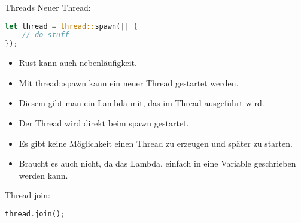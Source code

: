 
\begin{frame}[fragile,t]{Threads}
    Neuer Thread:
    \begin{lstlisting}[language=Rust,escapechar=@,label={lst:threads1-1}]
let thread = thread::spawn(|| {
    // do stuff
});\end{lstlisting}

     {
        \begin{itemize}
            \item Rust kann auch nebenläufigkeit.
            \item Mit thread::spawn kann ein neuer Thread gestartet werden.
            \item Diesem gibt man ein Lambda mit, das im Thread ausgeführt wird.
            \item Der Thread wird direkt beim spawn gestartet.
            \item Es gibt keine Möglichkeit einen Thread zu erzeugen und später zu starten.
            \item Braucht es auch nicht, da das Lambda, einfach in eine Variable geschrieben werden kann.
        \end{itemize}
    }

    \pause
    Thread join:
    \begin{lstlisting}[language=Rust,escapechar=@,label={lst:threads1-2}]
thread.join();
\end{lstlisting}


\end{frame}

